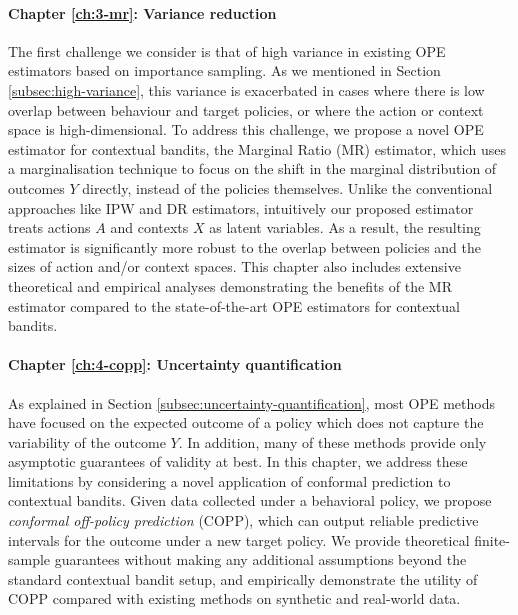\paragraph*{Chapter \ref*{ch:3-mr}: Variance reduction \citep{taufiq2023marginal}}
The first challenge we consider is that of high variance in existing OPE estimators based on importance sampling. 
As we mentioned in Section \ref{subsec:high-variance}, this variance is exacerbated in cases where there is low overlap between behaviour and target policies, or where the action or context space is high-dimensional.
To address this challenge, we propose a novel OPE estimator for contextual bandits, the Marginal Ratio (MR) estimator, which uses a marginalisation technique to focus on the shift in the marginal distribution of outcomes $Y$
directly, instead of the policies themselves. 
Unlike the conventional approaches like IPW and DR estimators, intuitively our proposed estimator treats actions $A$ and contexts $X$ as latent variables.
As a result, the resulting estimator is significantly more robust to the overlap between policies and the sizes of action and/or context spaces.
This chapter also includes extensive theoretical and empirical analyses demonstrating the benefits of the MR estimator compared to the state-of-the-art OPE estimators for contextual bandits.


\paragraph*{Chapter \ref*{ch:4-copp}: Uncertainty quantification \citep{taufiq2022conformal}}
As explained in Section \ref{subsec:uncertainty-quantification}, most OPE methods have focused on the expected outcome of a policy which does not capture the variability of the outcome $Y$.
In addition, many of these methods provide only asymptotic guarantees of validity at best. 
In this chapter, we address these limitations by considering a novel application of conformal prediction \citep{vovk2005algorithmic} to contextual bandits. 
Given data collected under a behavioral policy, we propose \emph{conformal off-policy prediction} (COPP), which can output reliable predictive intervals for the outcome under a new target policy. We provide theoretical finite-sample guarantees without making any additional assumptions beyond the standard contextual bandit setup, and empirically demonstrate the utility of COPP compared with existing methods on synthetic and real-world data.

